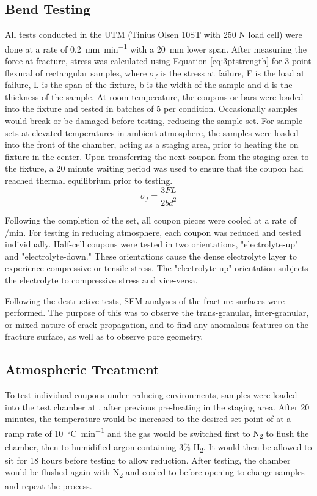\subsection{Bend Testing}

All tests conducted in the UTM (Tinius Olsen 10ST with 250 N load cell)
were done at a rate of \SI{0.2}{\milli\meter\per\minute} with a \SI{20}{\milli\meter} lower span.
After measuring the force at fracture, stress was calculated using Equation \ref{eq:3ptstrength}
for 3-point flexural of rectangular samples, where \(\sigma_{f}\) is the stress at failure, F is the load at failure, L is the span of the fixture, b is the width of the sample and d is the thickness of the sample.
At room temperature, the coupons or bars were loaded into the fixture and tested in batches of 5 per condition.
Occasionally samples would break or be damaged before testing, reducing the sample set.
For sample sets at elevated temperatures in ambient atmosphere, the samples were loaded into the front of the chamber, acting as a staging area,
prior to heating the on fixture in the center.
Upon transferring the next coupon from the staging area to the fixture, a 20 minute waiting period was used to ensure that the coupon had reached thermal equilibrium prior to testing.
\begin{equation}
    \sigma_{f} = \frac{3FL}{2bd^{2}}
    \label{eq:3ptstrength}
\end{equation}

Following the completion of the set, all coupon pieces were cooled at a rate of /min.
For testing in reducing atmosphere, each coupon was reduced and tested individually.
Half-cell coupons were tested in two orientations, "electrolyte-up" and "electrolyte-down." These orientations cause the dense electrolyte layer to experience compressive or tensile stress.
The "electrolyte-up" orientation subjects the electrolyte to compressive stress and vice-versa.

Following the destructive tests, SEM analyses of the fracture surfaces were performed.
The purpose of this was to observe the trans-granular,
inter-granular, or mixed nature of crack propagation, and to find any anomalous features on the fracture surface, as well as to observe pore geometry.

\subsection{Atmospheric Treatment}

To test individual coupons under reducing environments, samples were loaded into the test chamber at , after previous pre-heating in the staging area.
After 20 minutes, the temperature would be increased to the desired set-point of  at a ramp rate of \SI{10}{\celsius\per\minute} and the gas would be switched first to N\textsubscript{2} to flush the chamber, then to humidified argon containing 3\% H\textsubscript{2}.
It would then be allowed to sit for 18 hours before testing to allow reduction.
After testing, the chamber would be flushed again with N\textsubscript{2} and cooled to  before opening to change samples and repeat the process.

